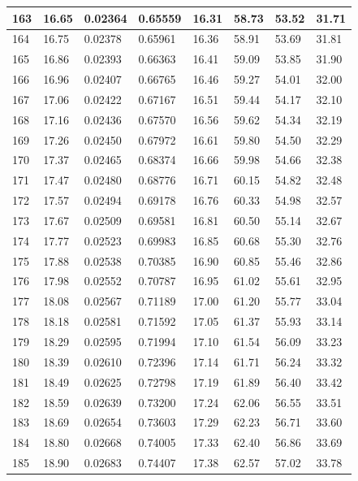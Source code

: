 \documentclass[12pt,a4paper,twoside]{article}
\begin{document}
\begin{center}
\begin{longtable}{l l l l | l l l l}
163 & 16.65 & 0.02364 & 0.65559 & 16.31 & 58.73 & 53.52 & 31.71 \\ \hline
164 & 16.75 & 0.02378 & 0.65961 & 16.36 & 58.91 & 53.69 & 31.81 \\ \hline
165 & 16.86 & 0.02393 & 0.66363 & 16.41 & 59.09 & 53.85 & 31.90 \\ \hline
166 & 16.96 & 0.02407 & 0.66765 & 16.46 & 59.27 & 54.01 & 32.00 \\ \hline
167 & 17.06 & 0.02422 & 0.67167 & 16.51 & 59.44 & 54.17 & 32.10 \\ \hline
168 & 17.16 & 0.02436 & 0.67570 & 16.56 & 59.62 & 54.34 & 32.19 \\ \hline
169 & 17.26 & 0.02450 & 0.67972 & 16.61 & 59.80 & 54.50 & 32.29 \\ \hline
170 & 17.37 & 0.02465 & 0.68374 & 16.66 & 59.98 & 54.66 & 32.38 \\ \hline
171 & 17.47 & 0.02480 & 0.68776 & 16.71 & 60.15 & 54.82 & 32.48 \\ \hline
172 & 17.57 & 0.02494 & 0.69178 & 16.76 & 60.33 & 54.98 & 32.57 \\ \hline
173 & 17.67 & 0.02509 & 0.69581 & 16.81 & 60.50 & 55.14 & 32.67 \\ \hline
174 & 17.77 & 0.02523 & 0.69983 & 16.85 & 60.68 & 55.30 & 32.76 \\ \hline
175 & 17.88 & 0.02538 & 0.70385 & 16.90 & 60.85 & 55.46 & 32.86 \\ \hline
176 & 17.98 & 0.02552 & 0.70787 & 16.95 & 61.02 & 55.61 & 32.95 \\ \hline
177 & 18.08 & 0.02567 & 0.71189 & 17.00 & 61.20 & 55.77 & 33.04 \\ \hline
178 & 18.18 & 0.02581 & 0.71592 & 17.05 & 61.37 & 55.93 & 33.14 \\ \hline
179 & 18.29 & 0.02595 & 0.71994 & 17.10 & 61.54 & 56.09 & 33.23 \\ \hline
180 & 18.39 & 0.02610 & 0.72396 & 17.14 & 61.71 & 56.24 & 33.32 \\ \hline
181 & 18.49 & 0.02625 & 0.72798 & 17.19 & 61.89 & 56.40 & 33.42 \\ \hline
182 & 18.59 & 0.02639 & 0.73200 & 17.24 & 62.06 & 56.55 & 33.51 \\ \hline
183 & 18.69 & 0.02654 & 0.73603 & 17.29 & 62.23 & 56.71 & 33.60 \\ \hline
184 & 18.80 & 0.02668 & 0.74005 & 17.33 & 62.40 & 56.86 & 33.69 \\ \hline
185 & 18.90 & 0.02683 & 0.74407 & 17.38 & 62.57 & 57.02 & 33.78 \\ \hline

\end{longtable}
\end{center}
\end{document}
